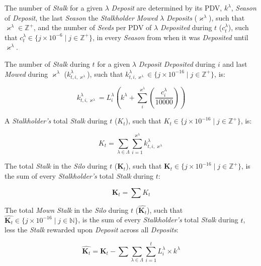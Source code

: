 \documentclass[tikz]{article}
\newcommand{\term}[1]{\textsl{#1}}
\begin{document}
The number of \term{Stalk} for a given $\lambda$ \term{Deposit} are determined by its PDV, $k^{\lambda}$,  \term{Season} of \term{Deposit}, the last \term{Season} the \term{Stalkholder} \term{Mowed} $\lambda$ \term{Deposits} ($\varkappa^{\lambda}$), such that $\varkappa^{\lambda} \in \mathbb{Z}^{+}$,  and the number of \term{Seeds} per PDV of $\lambda$ \term{Deposited} during $t$ ($c_{t}^{\lambda}$), such that $c_{t}^{\lambda} \in \{j \times 10^{-6} \mid j \in \mathbb{Z}^{+} \}$,  in every \term{Season} from when it was \term{Deposited} until $\varkappa^{\lambda}$.

The number of \term{Stalk} during $t$ for a given $\lambda$ \term{Deposit} \term{Deposited} during $i$ and last \term{Mowed} during $\varkappa^{\lambda}$ ({$k_{t,i,\varkappa^{\lambda}}^{\lambda}$}), such that $k_{t,i,\varkappa^{\lambda}}^{\lambda} \in \{j \times 10^{-16} \mid j \in \mathbb{Z}^{+} \}$, is:

    $$
        k_{t,i,\varkappa^{\lambda}}^{\lambda} = 
            L_{i}^{\lambda} \left( 
            k^{\lambda} + 
            \sum_{i}^{\varkappa^{\lambda}} \left
                (\frac{c_{i}^{\lambda}}
                        {10000}\right) 
            \right)
    $$

A \term{Stalkholder's} total \term{Stalk} during $t$ ($K_{t}$), such that $K_{t} \in \{j \times 10^{-16} \mid j \in \mathbb{Z}^{+} \}$, is:

    $$
        K_{t} = 
            \sum_{\lambda \in \Lambda}
                \sum_{i=1}^{\varkappa^{\lambda}}
                    k_{t,i,\varkappa^{\lambda}}^{\lambda}
    $$

The total \term{Stalk} in the \term{Silo} during $t$ ($\mathbf{K}_{t}$), such that $\mathbf{K}_{t} \in \{j \times 10^{-16} \mid j \in \mathbb{Z}^{+} \}$, is the sum of every \term{Stalkholder's} total \term{Stalk} during $t$:

    $$
        \mathbf{K}_{t} = 
            \sum{K_{t}}
    $$

\newpage

The total \term{Mown Stalk} in the \term{Silo} during $t$ ($\widehat{\mathbf{K}_{t}}$), such that $\widehat{\mathbf{K}_{t}} \in \{j \times 10^{-16} \mid j \in \mathbb{N} \}$, is the sum of every \term{Stalkholder's} total \term{Stalk} during $t$, less the \term{Stalk} rewarded upon \term{Deposit} across all \term{Deposits}:


    $$
        \widehat{\mathbf{K}_{t}} = 
            \mathbf{K}_{t} - \sum
            \sum_{\lambda \in \Lambda}
                \sum_{i=1}^{t}
                    L_{i}^{\lambda} \times k^{\lambda}
    $$
\end{document}
